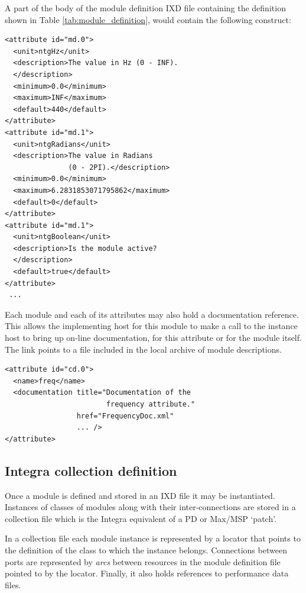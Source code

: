 \documentclass[10pt,journal,final]{IEEEtran}
\begin{document}
A part of the body of the module definition IXD file containing the definition shown in Table \ref{tab:module_definition}, would contain the following construct:

{\small
\begin{verbatim}
<attribute id="md.0">
  <unit>ntgHz</unit>
  <description>The value in Hz (0 - INF).
  </description>
  <minimum>0.0</minimum>
  <maximum>INF</maximum>
  <default>440</default>
</attribute>
<attribute id="md.1">
  <unit>ntgRadians</unit>
  <description>The value in Radians 
               (0 - 2PI).</description>
  <minimum>0.0</minimum>
  <maximum>6.2831853071795862</maximum>
  <default>0</default>
</attribute>
<attribute id="md.1">
  <unit>ntgBoolean</unit>
  <description>Is the module active?
  </description>
  <default>true</default>
</attribute>
 ...
\end{verbatim}
}

Each module and each of its attributes may also hold a documentation reference. This allows the implementing host for this module to make a call to the instance host to bring up on-line documentation, for this attribute or for the module itself. The link points to a file included in the local archive of module descriptions.
{\small
\begin{verbatim}
<attribute id="cd.0">
  <name>freq</name>
  <documentation title="Documentation of the 
                        frequency attribute." 
                 href="FrequencyDoc.xml" 
                 ... />
</attribute>
\end{verbatim}
}

\subsection{Integra collection definition}\label{subsect:integra_collection_definition}

Once a module is defined and stored in an IXD file it may be instantiated. Instances of classes of modules along with their inter-connections are stored in a collection file which is the Integra equivalent of a PD or Max/MSP `patch'.

In a collection file each module instance is represented by a locator that points to the definition of the class to which the instance belongs. Connections between ports are represented by \emph{arcs} between resources in the module definition file pointed to by the locator. Finally, it also holds references to performance data files.

\end{document}
